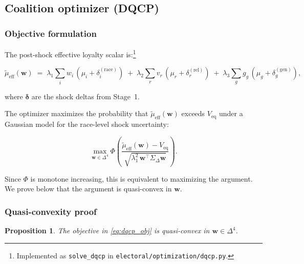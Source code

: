 \documentclass[12pt, letterpaper]{article}
\newtheorem{proposition}{Proposition}
\theoremstyle{definition}
\newcommand{\Veq}{V_{\mathrm{eq}}}
\newcommand{\SigmaDelta}{\Sigma_{\Delta}}
\newcommand{\lambdaone}{\lambda_1}
\newcommand{\lambdatwo}{\lambda_2}
\newcommand{\lambdathree}{\lambda_3}
\newcommand{\boldw}{\mathbf{w}}
\begin{document}
\subsection{Coalition optimizer (DQCP)}
\label{sec:optimizer}

\subsubsection{Objective formulation}

The post-shock effective loyalty scalar is:\footnote{Implemented as
\texttt{solve\_dqcp} in \texttt{electoral/optimization/dqcp.py}.}

\begin{equation}
  \tilde{\mu}_{\mathrm{eff}}(\boldw) \;=\;
    \lambdaone \sum_i w_i\,(\mu_i + \delta_i^{(\text{race})})
  \;+\; \lambdatwo \sum_r v_r\,(\mu_r + \delta_r^{(\text{rel})})
  \;+\; \lambdathree \sum_g g_g\,(\mu_g + \delta_g^{(\text{gen})}),
  \label{eq:mueff_shock}
\end{equation}

where $\boldsymbol{\delta}$ are the shock deltas from Stage~1.

The optimizer maximizes the probability that $\tilde{\mu}_{\mathrm{eff}}(\boldw)$
exceeds $\Veq$ under a Gaussian model for the race-level shock uncertainty:

\begin{equation}
  \max_{\boldw \in \Delta^4}
  \Phi\!\left(
    \frac{\tilde{\mu}_{\mathrm{eff}}(\boldw) - \Veq}
         {\sqrt{\lambdaone^2\, \boldw^\top \SigmaDelta \boldw}}
  \right).
  \label{eq:dqcp_obj}
\end{equation}

Since $\Phi$ is monotone increasing, this is equivalent to maximizing the
argument. We prove below that the argument is quasi-convex in $\boldw$.

\subsubsection{Quasi-convexity proof}

\begin{proposition}
\label{prop:qcvx}
The objective in \eqref{eq:dqcp_obj} is quasi-convex in $\boldw \in \Delta^4$.
\end{proposition}
\end{document}
